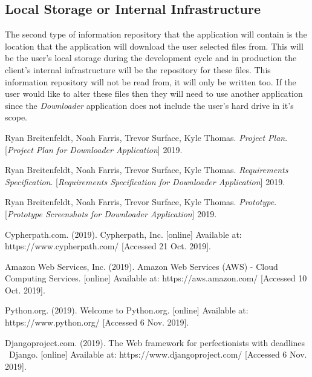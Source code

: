 \documentclass{article}
\begin{document}
    \subsection{Local Storage or Internal Infrastructure}
    The second type of information repository that the application will contain is the location that the
    application will download the user selected files from. This will be the user's local storage during the
    development cycle and in production the client's internal infrastructure will be the repository for these
    files. This information repository will not be read from, it will only be written too. If the user would like to alter
    these files then they will need to use another application since the \textit{Downloader} application does not
    include the user's hard drive in it's scope.

\newpage
{}
    \begin{thebibliography}{7}
    Ryan Breitenfeldt, Noah Farris, Trevor Surface, Kyle Thomas.
    \textit{Project Plan}.
    [\textit{Project Plan for Downloader Application}] 2019.

    Ryan Breitenfeldt, Noah Farris, Trevor Surface, Kyle Thomas.
    \textit{Requirements Specification}.
    [\textit{Requirements Specification for Downloader Application}] 2019.

    Ryan Breitenfeldt, Noah Farris, Trevor Surface, Kyle Thomas.
    \textit{Prototype}.
    [\textit{Prototype Screenshots for Downloader Application}] 2019.


    Cypherpath.com. (2019). Cypherpath, Inc. [online] Available at: https://www.cypherpath.com/ [Accessed 21 Oct. 2019].

    Amazon Web Services, Inc. (2019). Amazon Web Services (AWS) - Cloud Computing Services. [online] Available at: https://aws.amazon.com/ [Accessed 10 Oct. 2019].


    Python.org. (2019). Welcome to Python.org. [online] Available at: https://www.python.org/ [Accessed 6 Nov. 2019].

    Djangoproject.com. (2019). The Web framework for perfectionists with deadlines \textbar\ Django. [online] Available at: https://www.djangoproject.com/ [Accessed 6 Nov. 2019].
    \end{thebibliography}

\end{document}

